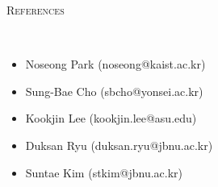 \documentclass[10pt]{article}
\newenvironment{changemargin}[2]{
  \begin{list}{}{
    \setlength{\topsep}{0pt}
    \setlength{\leftmargin}{#1}
    \setlength{\rightmargin}{#2}
    \setlength{\listparindent}{\parindent}
    \setlength{\itemindent}{\parindent}
    \setlength{\parsep}{\parskip}
  }
  \item[]}{\end{list}
}
\newcommand{\lineover}{
	\begin{changemargin}{-0.05in}{-0.05in}
		\vspace*{-8pt}
		\hrulefill \\
		\vspace*{-2pt}
	\end{changemargin}
}
\newcommand{\header}[1]{
	\begin{changemargin}{-0.5in}{-0.5in}
		\scshape{#1}\\
  	\lineover
	\end{changemargin}
}
\newenvironment{body} {
	\vspace*{-16pt}
	\begin{changemargin}{-0.25in}{-0.5in}
  }
	{\end{changemargin}
}
\begin{document}
\medskip

\header{References}

\begin{body}
	\vspace{14pt}
    \begin{itemize}
        \item Noseong Park  (noseong@kaist.ac.kr)
        \item Sung-Bae Cho  (sbcho@yonsei.ac.kr)
        \item Kookjin Lee  (kookjin.lee@asu.edu)
        \item Duksan Ryu (duksan.ryu@jbnu.ac.kr)
        \item Suntae Kim (stkim@jbnu.ac.kr)
    \end{itemize}
\end{body}


\medskip
\end{document}
